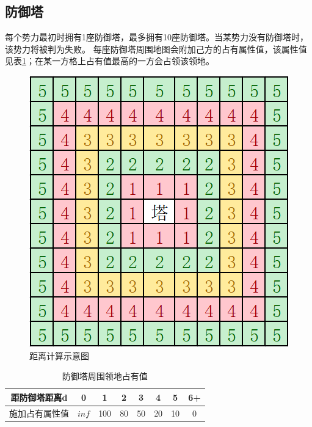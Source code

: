 \documentclass[a4paper,4pt]{article}
\begin{document}
\subsection{防御塔}
每个势力最初时拥有1座防御塔，最多拥有10座防御塔。当某势力没有防御塔时，该势力将被判为失败。
每座防御塔周围地图会附加己方的占有属性值，该属性值见表\ref{领地}；在某一方格上占有值最高的一方会占领该领地。
\begin{figure}[htbp]   %
  \centering
  \includegraphics[width=2.5 in]{距离.png}
  \caption{距离计算示意图}
  \label{jpg:示例图片2}
\end{figure}

\begin{table}[htbp]
  \centering
  \caption{防御塔周围领地占有值}
  \begin{tabular}{c|c|c|c|c|c|c|c}
    \hline
    距防御塔距离d  & 0     & 1   & 2  & 3  & 4  & 5  & 6+ \bigstrut \\
    \hline
    施加占有属性值 & $inf$ & 100 & 80 & 50 & 20 & 10 & 0 \bigstrut  \\
    \hline
  \end{tabular}%
  \label{领地}%
\end{table}%
\end{document}
